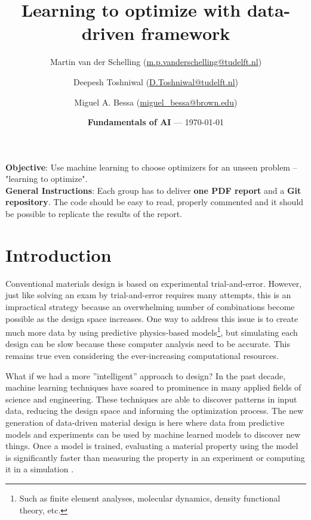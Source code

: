 \documentclass[10pt,a4paper,twoside]{article} %
\title{Learning to optimize with data-driven framework} %
\author[1]{Martin van der Schelling (\href{mailto:m.p.vanderschelling@tudelft.nl}{m.p.vanderschelling@tudelft.nl})}
\author[2]{Deepesh Toshniwal (\href{mailto:D.Toshniwal@tudelft.nl}{D.Toshniwal@tudelft.nl})}
\author[3]{Miguel A. Bessa (\href{mailto:miguel\_bessa@brown.edu}{miguel\_bessa@brown.edu})}
\affil[1]{Doctoral Researcher at Delft University of Technology, The Netherlands}
\affil[2]{Assistant Professor at Delft University of Technology, The Netherlands}
\affil[3]{Associate Professor at Brown University, USA}
\date{\textbf{Fundamentals of AI} --- \today} %
\begin{document}
\maketitle %


\begin{framed}
    \textbf{Objective}: Use machine learning to choose optimizers for an unseen problem -- "learning to optimize".\\
	\textbf{General Instructions}: Each group has to deliver \textbf{one PDF report} and a \textbf{Git repository}. The code should be easy to read, properly commented and it should be possible to replicate the results of the report.
\end{framed}


\section*{Introduction}

Conventional materials design is based on experimental trial-and-error. However, just like solving an exam by trial-and-error requires many attempts, this is an impractical strategy because an overwhelming number of combinations become possible as the design space increases. One way to address this issue is to create much more data by using predictive physics-based models\footnote{Such as finite element analyses, molecular dynamics, density functional theory, etc.}, but simulating each design can be slow because these computer analysis need to be accurate. This remains true even considering the ever-increasing computational resources.

What if we had a more ''intelligent'' approach to design? In the past decade, machine learning techniques have soared to prominence in many applied fields of science and engineering. These techniques are able to discover patterns in input data, reducing the design space and informing the optimization process. The new generation of data-driven material design is here where data from predictive models and experiments can be used by machine learned models to discover new things. Once a model is trained, evaluating a material property using the model is significantly faster than measuring the property in an experiment or computing it in a simulation \cite{Kadulkar2022, Guo2021}.
\end{document}
